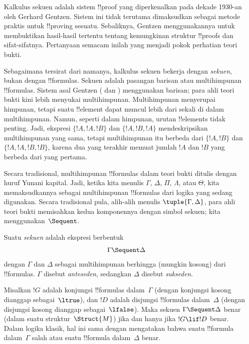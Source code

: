 \documentclass[../../../include/open-logic-section]{subfiles}
\begin{document}


Kalkulus sekuen adalah sistem !!{proof} yang diperkenalkan pada dekade 1930-an
oleh Gerhard Gentzen. Sistem ini tidak terutama dimaksudkan sebagai metode
praktis untuk !!{proving} sesuatu. Sebaliknya, Gentzen menggunakannya untuk
membuktikan hasil-hasil tertentu tentang kemungkinan struktur !!{proof}s dan
sifat-sifatnya. Pertanyaan semacam inilah yang menjadi pokok perhatian teori
bukti.

Sebagaimana tersirat dari namanya, kalkulus sekuen bekerja dengan
\emph{sekuen}, bukan dengan !!{formula}s. Sekuen adalah pasangan barisan atau
multihimpunan !!{formula}s. Sistem asal Gentzen ( dan )
menggunakan barisan; para ahli teori bukti kini lebih menyukai multihimpunan.
Multihimpunan menyerupai himpunan, tetapi suatu !!{element} dapat muncul lebih
dari sekali di dalam multihimpunan. Namun, seperti dalam himpunan, urutan
!!{element}s tidak penting. Jadi, ekspresi $\{!A,!A,!B\}$ dan
$\{!A,!B,!A\}$ mendeskripsikan multihimpunan yang sama, tetapi multihimpunan
itu berbeda dari $\{!A,!B\}$ dan $\{!A,!A,!B,!B\}$, karena dua yang terakhir
memuat jumlah $!A$ dan $!B$ yang berbeda dari yang pertama.

Secara tradisional, multihimpunan !!{formula}s dalam teori bukti ditulis
dengan huruf Yunani kapital. Jadi, ketika kita menulis $\Gamma$, $\Delta$,
$\Pi$, $\Lambda$, atau $\Theta$, kita memaksudkannya sebagai multihimpunan
!!{formula}s dari logika yang sedang digunakan. Secara tradisional pula,
alih-alih menulis $\tuple{\Gamma,\Delta}$, para ahli teori bukti memisahkan
kedua komponennya dengan simbol sekuen; kita menggunakan~$\Sequent$.

\begin{defn}[Sekuen]
Suatu \emph{sekuen} adalah ekspresi berbentuk
\[
\Gamma \Sequent \Delta
\]
dengan $\Gamma$ dan $\Delta$ sebagai multihimpunan berhingga (mungkin kosong)
dari !!{formula}s. $\Gamma$ disebut \emph{anteseden}, sedangkan $\Delta$
disebut \emph{sukseden}.
\end{defn}

Misalkan $!G$ adalah konjungsi !!{formula}s dalam~$\Gamma$ (dengan konjungsi
kosong dianggap sebagai~$\ltrue$), dan $!D$ adalah disjungsi !!{formula}s
dalam~$\Delta$ (dengan disjungsi kosong dianggap sebagai~$\lfalse$). Maka
sekuen $\Gamma\Sequent\Delta$ benar (dalam suatu struktur~$\Struct{M}$) jika
dan hanya jika $!G\lif !D$ benar. Dalam logika klasik, hal ini sama dengan
mengatakan bahwa suatu !!{formula} dalam~$\Gamma$ salah atau suatu
!!{formula} dalam~$\Delta$ benar.
\end{document}
